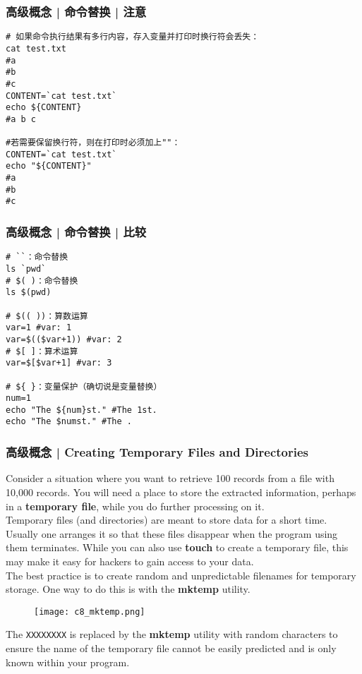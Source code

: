 \begin{frame}[fragile]
  \frametitle{高级概念 | 命令替换 | \alert{注意}}
\begin{lstlisting}
# 如果命令执行结果有多行内容，存入变量并打印时换行符会丢失：
cat test.txt
#a
#b
#c
CONTENT=`cat test.txt`
echo ${CONTENT}
#a b c

#若需要保留换行符，则在打印时必须加上""：
CONTENT=`cat test.txt`
echo "${CONTENT}"
#a
#b
#c
\end{lstlisting}
\end{frame}

\begin{frame}[fragile]
  \frametitle{高级概念 | 命令替换 | \alert{比较}}
\begin{lstlisting}
# ``：命令替换
ls `pwd`
# $( )：命令替换
ls $(pwd)

# $(( ))：算数运算
var=1 #var: 1
var=$(($var+1)) #var: 2
# $[ ]：算术运算
var=$[$var+1] #var: 3

# ${ }：变量保护（确切说是变量替换）
num=1
echo "The ${num}st." #The 1st.
echo "The $numst." #The .
\end{lstlisting}
\end{frame}

\begin{frame}[fragile]
  \frametitle{高级概念 | Creating Temporary Files and Directories}
  {\footnotesize
  Consider a situation where you want to retrieve 100 records from a file with 10,000 records. You will need a place to store the extracted information, perhaps in a \textbf{temporary file}, while you do further processing on it.\\
  \vspace{0.1cm}
  Temporary files (and directories) are meant to store data for a short time. Usually one arranges it so that these files disappear when the program using them terminates. While you can also use \textbf{touch} to create a temporary file, this may make it easy for hackers to gain access to your data.\\
  \vspace{0.1cm}
  The best practice is to create random and unpredictable filenames for temporary storage. One way to do this is with the \textbf{mktemp} utility.
  \vspace{-0.3cm}
  \begin{figure}
    \centering
    \texttt{[image: c8\_mktemp.png]}
  \end{figure}
  \vspace{-0.3cm}
  The \verb|XXXXXXXX| is replaced by the \textbf{mktemp} utility with random characters to ensure the name of the temporary file cannot be easily predicted and is only known within your program.
  }
\end{frame}

